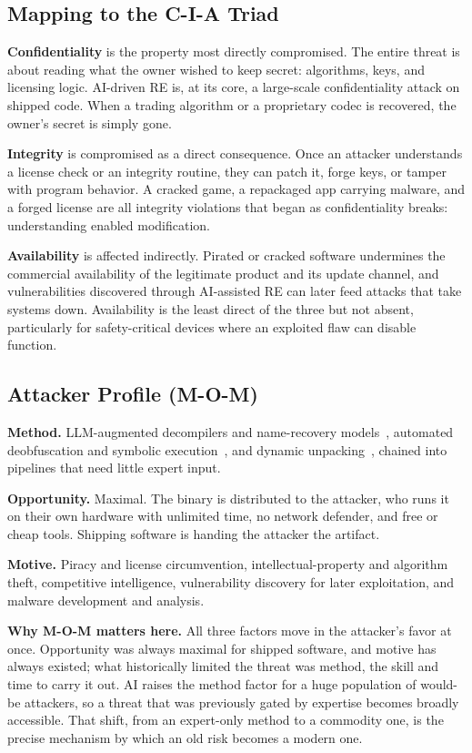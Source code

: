 \documentclass[conference]{IEEEtran}
\begin{document}
\subsection{Mapping to the C-I-A Triad}
\textbf{Confidentiality} is the property most directly compromised. The entire
threat is about reading what the owner wished to keep secret: algorithms, keys, and
licensing logic. AI-driven RE is, at its core, a large-scale confidentiality attack
on shipped code. When a trading algorithm or a proprietary codec is recovered, the
owner's secret is simply gone.

\textbf{Integrity} is compromised as a direct consequence. Once an attacker
understands a license check or an integrity routine, they can patch it, forge keys,
or tamper with program behavior. A cracked game, a repackaged app carrying malware,
and a forged license are all integrity violations that began as confidentiality
breaks: understanding enabled modification.

\textbf{Availability} is affected indirectly. Pirated or cracked software undermines
the commercial availability of the legitimate product and its update channel, and
vulnerabilities discovered through AI-assisted RE can later feed attacks that take
systems down. Availability is the least direct of the three but not absent,
particularly for safety-critical devices where an exploited flaw can disable
function.

\subsection{Attacker Profile (M-O-M)}
\textbf{Method.} LLM-augmented decompilers and name-recovery
models~\cite{llm4decompile,resym,gennm}, automated deobfuscation and symbolic
execution~\cite{angr,udupa}, and dynamic unpacking~\cite{rolles}, chained into
pipelines that need little expert input.

\textbf{Opportunity.} Maximal. The binary is distributed to the attacker, who runs
it on their own hardware with unlimited time, no network defender, and free or cheap
tools. Shipping software is handing the attacker the artifact.

\textbf{Motive.} Piracy and license circumvention, intellectual-property and
algorithm theft, competitive intelligence, vulnerability discovery for later
exploitation, and malware development and analysis.

\textbf{Why M-O-M matters here.} All three factors move in the attacker's favor at
once. Opportunity was always maximal for shipped software, and motive has always
existed; what historically limited the threat was method, the skill and time to
carry it out. AI raises the method factor for a huge population of would-be
attackers, so a threat that was previously gated by expertise becomes broadly
accessible. That shift, from an expert-only method to a commodity one, is the
precise mechanism by which an old risk becomes a modern one.
\end{document}
